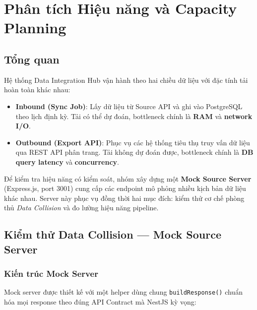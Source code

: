 \newpage
\section{Phân tích Hiệu năng và Capacity Planning}
\label{sec:performance}

\subsection{Tổng quan}

Hệ thống Data Integration Hub vận hành theo hai chiều dữ liệu với
đặc tính tải hoàn toàn khác nhau:

\begin{itemize}
  \item \textbf{Inbound (Sync Job)}: Lấy dữ liệu từ Source API và
        ghi vào PostgreSQL theo lịch định kỳ. Tải có thể dự đoán,
        bottleneck chính là \textbf{RAM} và \textbf{network I/O}.
  \item \textbf{Outbound (Export API)}: Phục vụ các hệ thống tiêu
        thụ truy vấn dữ liệu qua REST API phân trang. Tải không dự
        đoán được, bottleneck chính là \textbf{DB query latency} và
        \textbf{concurrency}.
\end{itemize}

Để kiểm tra hiệu năng có kiểm soát, nhóm xây dựng một
\textbf{Mock Source Server} (Express.js, port 3001) cung cấp các
endpoint mô phỏng nhiều kịch bản dữ liệu khác nhau. Server này
phục vụ đồng thời hai mục đích: kiểm thử cơ chế phòng thủ
\textit{Data Collision} và đo lường hiệu năng pipeline.

\subsection{Kiểm thử Data Collision — Mock Source Server}
\label{sec:perf-collision-test}

\subsubsection{Kiến trúc Mock Server}

Mock server được thiết kế với một helper dùng chung
\texttt{buildResponse()} chuẩn hóa mọi response theo đúng API
Contract mà NestJS kỳ vọng:

